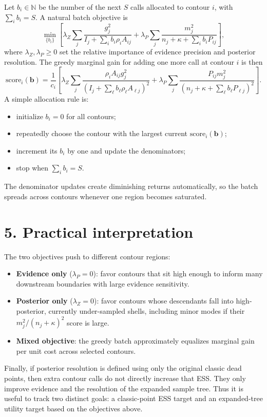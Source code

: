 \documentclass[10pt]{article}
\begin{document}
Let $b_i\in\mathbb{N}$ be the number of the next $S$ calls allocated to contour $i$, with $\sum_i b_i=S$. A natural batch objective is
\[
\min_{\{b_i\}}
\left[
\lambda_Z\sum_j\frac{g_j^2}{I_j+\sum_i b_i\rho_iA_{ij}}
+\lambda_P\sum_j\frac{m_j^2}{n_j+\kappa+\sum_i b_iP_{ij}}
\right],
\]
where $\lambda_Z,\lambda_P\ge 0$ set the relative importance of evidence precision and posterior resolution. The greedy marginal gain for adding one more call at contour $i$ is then
\[
\boxed{
\mathrm{score}_i(\mathbf b)
=
\frac{1}{c_i}
\left[
\lambda_Z\sum_j\frac{\rho_iA_{ij}g_j^2}{\left(I_j+\sum_\ell b_\ell\rho_\ell A_{\ell j}\right)^2}
+
\lambda_P\sum_j\frac{P_{ij}m_j^2}{\left(n_j+\kappa+\sum_\ell b_\ell P_{\ell j}\right)^2}
\right].
}
\]
A simple allocation rule is:
\begin{itemize}
    \item initialize $b_i=0$ for all contours;
    \item repeatedly choose the contour with the largest current $\mathrm{score}_i(\mathbf b)$;
    \item increment its $b_i$ by one and update the denominators;
    \item stop when $\sum_i b_i=S$.
\end{itemize}
The denominator updates create diminishing returns automatically, so the batch spreads across contours whenever one region becomes saturated.

\section*{5. Practical interpretation}

The two objectives push to different contour regions:
\begin{itemize}
    \item \textbf{Evidence only} ($\lambda_P=0$): favor contours that sit high enough to inform many downstream boundaries with large evidence sensitivity.
    \item \textbf{Posterior only} ($\lambda_Z=0$): favor contours whose descendants fall into high-posterior, currently under-sampled shells, including minor modes if their $m_j^2/(n_j+\kappa)^2$ score is large.
    \item \textbf{Mixed objective}: the greedy batch approximately equalizes marginal gain per unit cost across selected contours.
\end{itemize}

Finally, if posterior resolution is defined using only the original classic dead points, then extra contour calls do not directly increase that ESS. They only improve evidence and the resolution of the expanded sample tree. Thus it is useful to track two distinct goals: a classic-point ESS target and an expanded-tree utility target based on the objectives above.
\end{document}
